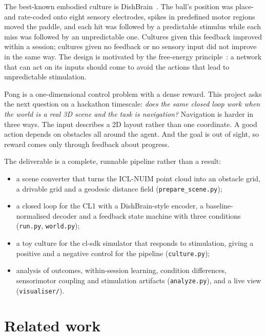\documentclass[11pt,a4paper]{article}
\newcommand{\code}[1]{\texttt{#1}}
\begin{document}
The best-known embodied culture is DishBrain~\citep{kagan2022dishbrain}. The ball's position
was place- and rate-coded onto eight sensory electrodes, spikes in predefined motor regions
moved the paddle, and each hit was followed by a predictable stimulus while each miss was
followed by an unpredictable one. Cultures given this feedback improved within a session;
cultures given no feedback or no sensory input did not improve in the same way. The design is
motivated by the free-energy principle~\citep{friston2010fep}: a network that can act on its
inputs should come to avoid the actions that lead to unpredictable stimulation.

Pong is a one-dimensional control problem with a dense reward. This project asks the next
question on a hackathon timescale: \emph{does the same closed loop work when the world is a real
3D scene and the task is navigation?} Navigation is harder in three ways. The input describes a
2D layout rather than one coordinate. A good action depends on obstacles all around the agent.
And the goal is out of sight, so reward comes only through feedback about progress.

The deliverable is a complete, runnable pipeline rather than a result:
\begin{itemize}[nosep]
  \item a scene converter that turns the ICL-NUIM point cloud into an obstacle grid, a drivable
        grid and a geodesic distance field (\code{prepare\_scene.py});
  \item a closed loop for the CL1 with a DishBrain-style encoder, a baseline-normalised
        decoder and a feedback state machine with three conditions (\code{run.py}, \code{world.py});
  \item a toy culture for the cl-sdk simulator that responds to stimulation, giving a positive
        and a negative control for the pipeline (\code{culture.py});
  \item analysis of outcomes, within-session learning, condition differences, sensorimotor
        coupling and stimulation artifacts (\code{analyze.py}), and a live view
        (\code{visualiser/}).
\end{itemize}

\section{Related work}
\end{document}
